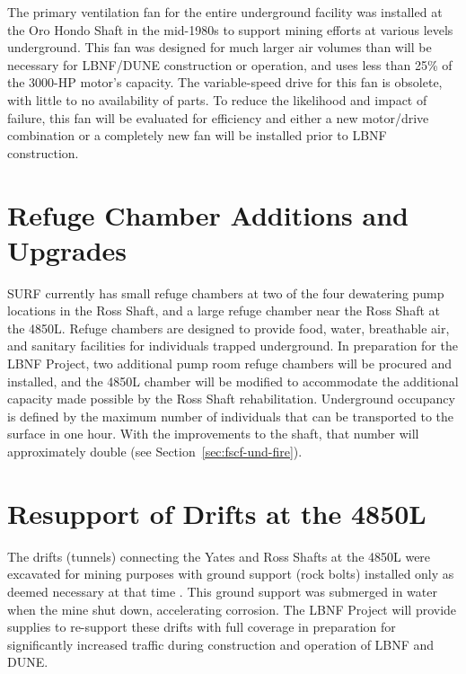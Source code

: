 The primary ventilation fan for the entire underground facility was installed at the Oro Hondo Shaft in the mid-1980s to support mining efforts at various levels underground.  This fan was designed for much larger air volumes than will be necessary for LBNF/DUNE construction or operation, and uses less than 25\% of the 3000-HP motor's capacity.  The variable-speed drive for this fan is obsolete, with little to no  availability of parts.  To reduce the likelihood and impact of failure, this fan will be evaluated for efficiency and either a new motor/drive combination or a completely new fan will be installed prior to LBNF construction.
 
\section{Refuge Chamber Additions and Upgrades}
\label{ch:fscf-site-prep-refuge}

SURF currently has small refuge chambers at two of the four dewatering pump locations in the Ross Shaft, and a large refuge chamber near the Ross Shaft at the 4850L.  Refuge chambers are designed to provide food, water, breathable air, and sanitary facilities for individuals trapped underground.  In preparation for the LBNF Project, two additional pump room refuge chambers will be procured and installed, and the 4850L chamber will be modified to accommodate the additional capacity made possible by the Ross Shaft rehabilitation.  Underground occupancy is defined by the maximum number of individuals that can be transported to the surface in one hour.  With the improvements to the shaft, that number will approximately double (see Section~\ref{sec:fscf-und-fire}).
 
\section{Resupport of Drifts at the 4850L}
\label{ch:fscf-site-prep-ground}

The drifts (tunnels) connecting the Yates and Ross Shafts at the 4850L were excavated for mining purposes with ground support (rock bolts) installed only as deemed necessary at that time .  This ground support was submerged in water when the mine shut down, accelerating corrosion.  The LBNF Project will provide supplies to re-support these drifts with full coverage in preparation for significantly increased traffic during construction and operation of LBNF and DUNE.
 
